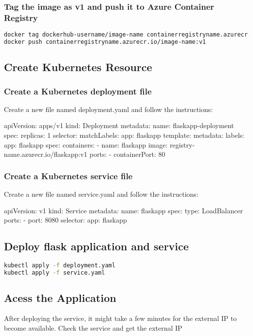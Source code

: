 \documentclass{article}
\begin{document}
		\subsubsection{Tag the image as v1 and push it to Azure Container Registry}
\begin{lstlisting}[language=bash]
docker tag dockerhub-username/image-name containerregistryname.azurecr.io/image-name:v1
docker push containerregistryname.azurecr.io/image-name:v1
\end{lstlisting}
	\subsection{Create Kubernetes Resource}
		\subsubsection{Create a Kubernetes deployment file}
Create a new file named deployment.yaml and follow the instructions:
\begin{python}
apiVersion: apps/v1
kind: Deployment
metadata:
  name: flaskapp-deployment
spec:
  replicas: 1
  selector:
    matchLabels:
      app: flaskapp
  template:
    metadata:
      labels:
        app: flaskapp
    spec:
      containers:
      - name: flaskapp
        image: registry-name.azurecr.io/flaskapp:v1
        ports:
        - containerPort: 80
\end{python}
		\subsubsection{Create a Kubernetes service file}
Create a new file named service.yaml and follow the instructions:
\begin{python}
apiVersion: v1
kind: Service
metadata:
  name: flaskapp
spec:
  type: LoadBalancer
  ports:
  - port: 8080
  selector:
    app: flaskapp
\end{python}

	\subsection{Deploy flask application and service}
\begin{lstlisting}[language=bash]
kubectl apply -f deployment.yaml
kubectl apply -f service.yaml
\end{lstlisting}

	\subsection{Acess the Application}
After deploying the service, it might take a few minutes for the external IP to become available. Check the service and get the external IP
\end{document}
